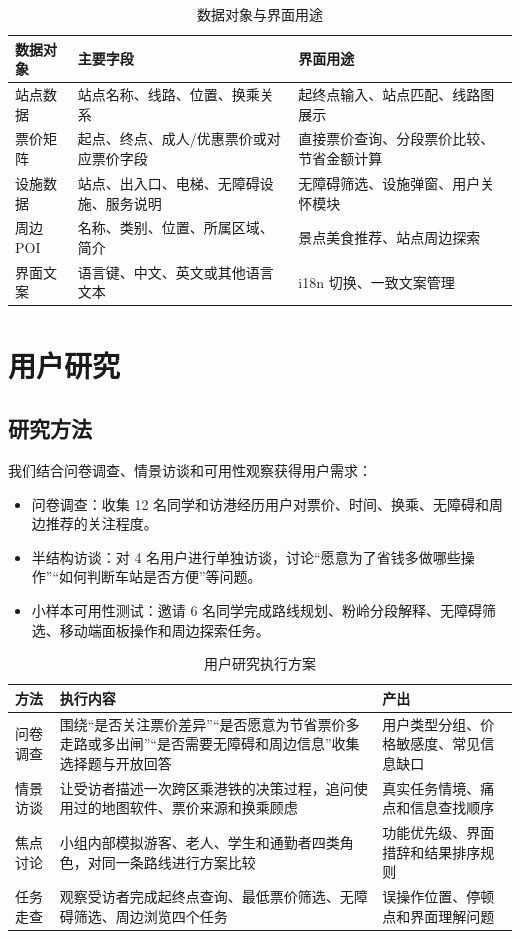 \documentclass[UTF8,a4paper,11pt]{ctexart}
\begin{document}
\begin{table}[H]
  \centering
  \caption{数据对象与界面用途}
  \begin{tabularx}{\textwidth}{p{}YY}
    \toprule
    数据对象 & 主要字段 & 界面用途 \\
    \midrule
    站点数据 & 站点名称、线路、位置、换乘关系 & 起终点输入、站点匹配、线路图展示 \\
    票价矩阵 & 起点、终点、成人/优惠票价或对应票价字段 & 直接票价查询、分段票价比较、节省金额计算 \\
    设施数据 & 站点、出入口、电梯、无障碍设施、服务说明 & 无障碍筛选、设施弹窗、用户关怀模块 \\
    周边 POI & 名称、类别、位置、所属区域、简介 & 景点美食推荐、站点周边探索 \\
    界面文案 & 语言键、中文、英文或其他语言文本 & i18n 切换、一致文案管理 \\
    \bottomrule
  \end{tabularx}
\end{table}

\section{用户研究}

\subsection{研究方法}

我们结合问卷调查、情景访谈和可用性观察获得用户需求：
\begin{itemize}
  \item 问卷调查：收集 12 名同学和访港经历用户对票价、时间、换乘、无障碍和周边推荐的关注程度。
  \item 半结构访谈：对 4 名用户进行单独访谈，讨论“愿意为了省钱多做哪些操作”“如何判断车站是否方便”等问题。
  \item 小样本可用性测试：邀请 6 名同学完成路线规划、粉岭分段解释、无障碍筛选、移动端面板操作和周边探索任务。
\end{itemize}

\begin{table}[H]
  \centering
  \caption{用户研究执行方案}
  \begin{tabularx}{\textwidth}{p{}YY}
    \toprule
    方法 & 执行内容 & 产出 \\
    \midrule
    问卷调查 & 围绕“是否关注票价差异”“是否愿意为节省票价多走路或多出闸”“是否需要无障碍和周边信息”收集选择题与开放回答 & 用户类型分组、价格敏感度、常见信息缺口 \\
    情景访谈 & 让受访者描述一次跨区乘港铁的决策过程，追问使用过的地图软件、票价来源和换乘顾虑 & 真实任务情境、痛点和信息查找顺序 \\
    焦点讨论 & 小组内部模拟游客、老人、学生和通勤者四类角色，对同一条路线进行方案比较 & 功能优先级、界面措辞和结果排序规则 \\
    任务走查 & 观察受访者完成起终点查询、最低票价筛选、无障碍筛选、周边浏览四个任务 & 误操作位置、停顿点和界面理解问题 \\
    \bottomrule
  \end{tabularx}
\end{table}
\end{document}
